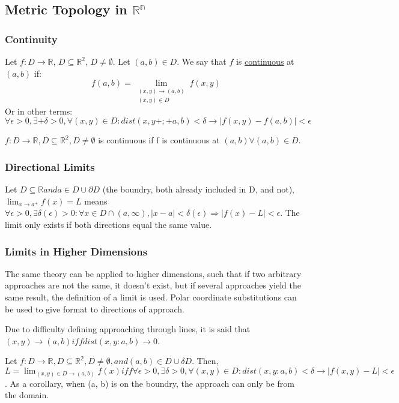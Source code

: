 \documentclass[11 pt, twoside]{article}
\begin{document}
\subsection{Metric Topology in $\mathbb{R^n}$}
\subsubsection{Continuity}
Let $f: D\to\mathbb{R}$, $D\subseteq\mathbb{R}^2$, $D\neq\emptyset$. Let $(a, b)\in D$. We say that $f$ is \underline{continuous} at $(a, b)$ if:
$$f(a, b) = \lim_{\substack{(x, y)\to(a,b)\\(x, y)\in D}} f(x, y)$$
Or in other terms:
$$\forall \epsilon > 0, \exists+ \delta>0, \forall (x, y)\in D: dist(x,
y+;+a,b) < \delta \to |f(x,y) - f(a,b)| < \epsilon$$

$f:D \to \mathbb{R}, D \subseteq \mathbb{R^2}, D \neq \emptyset$ is continuous if f is continuous at $(a, b) \forall (a, b) \in D.$

\subsubsection{Directional Limits}
Let $D \subseteq \mathbb{R} and a \in D \cup \partial D$ (the boundry, both already included in D, and not), $\lim_{x \to a^+} f(x) = L$ means $\forall \epsilon > 0, \exists \delta(\epsilon) > 0: \forall x \in D \cap (a, \infty), |x-a| < \delta(\epsilon) \Rightarrow |f(x) - L| < \epsilon$. The limit only exists if both directions equal the same value.

\subsubsection{Limits in Higher Dimensions}
The same theory can be applied to higher dimensions, such that if two arbitrary approaches are not the same, it doesn't exist, but if several approaches yield the same result, the definition of a limit is used. Polar coordinate substitutions can be used to give format to directions of approach.

Due to difficulty defining approaching through lines, it is said that $(x, y) \to (a, b) iff dist(x, y: a, b) \to 0$.

Let $f: D \to \mathbb{R}, D \subseteq \mathbb{R^2}, D \neq \emptyset, and (a, b) \in D \cup \delta D.$ Then, $L = \lim_{(x, y) \in D \to (a,b)} f(x) iff \forall \epsilon > 0, \exists \delta > 0, \forall (x, y) \in D: dist(x, y: a, b) < \delta \to |f(x, y) - L| < \epsilon$. As a corollary, when (a, b) is on the boundry, the approach can only be from the domain.
\end{document}
